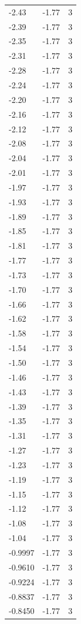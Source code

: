 \begin{longtable}{lrr}
  -2.43 & -1.77 & 3 \\
  -2.39 & -1.77 & 3 \\
  -2.35 & -1.77 & 3 \\
  -2.31 & -1.77 & 3 \\
  -2.28 & -1.77 & 3 \\
  -2.24 & -1.77 & 3 \\
  -2.20 & -1.77 & 3 \\
  -2.16 & -1.77 & 3 \\
  -2.12 & -1.77 & 3 \\
  -2.08 & -1.77 & 3 \\
  -2.04 & -1.77 & 3 \\
  -2.01 & -1.77 & 3 \\
  -1.97 & -1.77 & 3 \\
  -1.93 & -1.77 & 3 \\
  -1.89 & -1.77 & 3 \\
  -1.85 & -1.77 & 3 \\
  -1.81 & -1.77 & 3 \\
  -1.77 & -1.77 & 3 \\
  -1.73 & -1.77 & 3 \\
  -1.70 & -1.77 & 3 \\
  -1.66 & -1.77 & 3 \\
  -1.62 & -1.77 & 3 \\
  -1.58 & -1.77 & 3 \\
  -1.54 & -1.77 & 3 \\
  -1.50 & -1.77 & 3 \\
  -1.46 & -1.77 & 3 \\
  -1.43 & -1.77 & 3 \\
  -1.39 & -1.77 & 3 \\
  -1.35 & -1.77 & 3 \\
  -1.31 & -1.77 & 3 \\
  -1.27 & -1.77 & 3 \\
  -1.23 & -1.77 & 3 \\
  -1.19 & -1.77 & 3 \\
  -1.15 & -1.77 & 3 \\
  -1.12 & -1.77 & 3 \\
  -1.08 & -1.77 & 3 \\
  -1.04 & -1.77 & 3 \\
  -0.9997 & -1.77 & 3 \\
  -0.9610 & -1.77 & 3 \\
  -0.9224 & -1.77 & 3 \\
  -0.8837 & -1.77 & 3 \\
  -0.8450 & -1.77 & 3 \\

\end{longtable}
